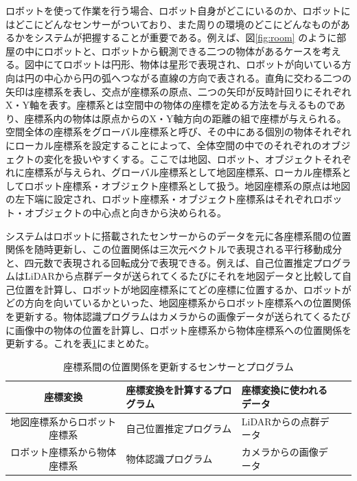 \documentclass[a4paper]{jreport}	%
\begin{document}
ロボットを使って作業を行う場合、ロボット自身がどこにいるのか、ロボットにはどこにどんなセンサーがついており、また周りの環境のどこにどんなものがあるかをシステムが把握することが重要である\cite{tf}。例えば、図\ref{fig:room} のように部屋の中にロボットと、ロボットから観測できる二つの物体があるケースを考える。図中にてロボットは円形、物体は星形で表現され、ロボットが向いている方向は円の中心から円の弧へつながる直線の方向で表される。直角に交わる二つの矢印は座標系を表し、交点が座標系の原点、二つの矢印が反時計回りにそれぞれX・Y軸を表す。座標系とは空間中の物体の座標を定める方法を与えるものであり、座標系内の物体は原点からのX・Y軸方向の距離の組で座標が与えられる。空間全体の座標系をグローバル座標系と呼び、その中にある個別の物体それぞれにローカル座標系を設定することによって、全体空間の中でのそれぞれのオブジェクトの変化を扱いやすくする。ここでは地図、ロボット、オブジェクトそれぞれに座標系が与えられ、グローバル座標系として地図座標系、ローカル座標系としてロボット座標系・オブジェクト座標系として扱う。地図座標系の原点は地図の左下端に設定され、ロボット座標系・オブジェクト座標系はそれぞれロボット・オブジェクトの中心点と向きから決められる。

システムはロボットに搭載されたセンサーからのデータを元に各座標系間の位置関係を随時更新し、この位置関係は三次元ベクトルで表現される平行移動成分と、四元数で表現される回転成分で表現できる。例えば、自己位置推定プログラムはLiDARから点群データが送られてくるたびにそれを地図データと比較して自己位置を計算し、ロボットが地図座標系にてどの座標に位置するか、ロボットがどの方向を向いているかといった、地図座標系からロボット座標系への位置関係を更新する\cite{tf}。物体認識プログラムはカメラからの画像データが送られてくるたびに画像中の物体の位置を計算し、ロボット座標系から物体座標系への位置関係を更新する。これを表\ref{table:sensor-prog}にまとめた。

\begin{table}[h]
	\centering
	 \begin{tabular}{clll}
   \hline
    座標変換 & 座標変換を計算するプログラム & 座標変換に使われるデータ \\
    \hline \hline
   地図座標系からロボット座標系 & 自己位置推定プログラム & LiDARからの点群データ \\
   ロボット座標系から物体座標系 & 物体認識プログラム & カメラからの画像データ \\            
   \hline
  \end{tabular} 
  \caption{座標系間の位置関係を更新するセンサーとプログラム}
	\label{table:sensor-prog}
\end{table}
\end{document}
